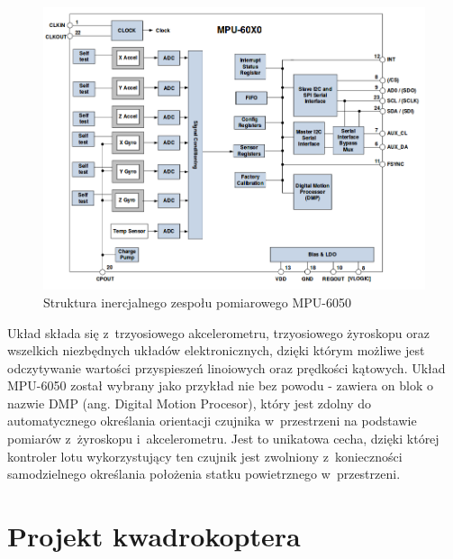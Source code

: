 \documentclass[11pt, twoside]{Thesis} %
\begin{document}
\begin{figure}[H]
	\centering
	\includegraphics[scale=0.5]{Pictures/IMU.png}
        \caption[Struktura inercjalnego zespołu pomiarowego]{Struktura inercjalnego zespołu pomiarowego MPU-6050~\cite{ds_mpu6050}}
        \label{fig:IMU}
\end{figure}

Układ składa się z~trzyosiowego akcelerometru, trzyosiowego żyroskopu oraz wszelkich niezbędnych układów elektronicznych, dzięki którym możliwe jest odczytywanie wartości przyspieszeń linoiowych oraz prędkości kątowych. Układ MPU-6050 został wybrany jako przykład nie bez powodu - zawiera on blok o nazwie DMP (ang. Digital Motion Procesor), który jest zdolny do automatycznego określania orientacji czujnika w~przestrzeni na podstawie pomiarów z~żyroskopu i~akcelerometru. Jest to unikatowa cecha, dzięki której kontroler lotu wykorzystujący ten czujnik jest zwolniony z~konieczności samodzielnego określania  położenia statku powietrznego w~przestrzeni. 

% 

\chapter{Projekt kwadrokoptera} %

\label{Chapter5} %
\end{document}
